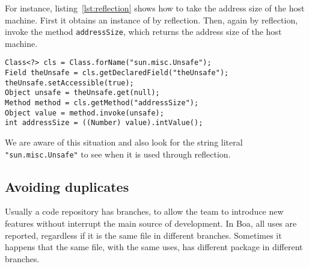 For instance, listing~\ref{lst:reflection} shows how to take the address size of the host machine.
First it obtains an instance of \smu{} by reflection.
Then, again by reflection, invoke the method \texttt{addressSize}, which returns the address size of the host machine.


 

\lstset{style=java}
\lstset{escapechar=§}

\begin{lstlisting}[caption=Use of sun.misc.Unsafe with reflection,label=lst:reflection]
Class<?> cls = Class.forName("sun.misc.Unsafe");
Field theUnsafe = cls.getDeclaredField("theUnsafe");
theUnsafe.setAccessible(true);
Object unsafe = theUnsafe.get(null);
Method method = cls.getMethod("addressSize");
Object value = method.invoke(unsafe);
int addressSize = ((Number) value).intValue();
\end{lstlisting}

We are aware of this situation and also look for the string literal \texttt{"sun.misc.Unsafe"} to see when it is used through reflection.

\subsection{Avoiding duplicates}

Usually a code repository has branches, to allow the team to introduce new features without interrupt the main source of development.
In Boa, all \smu{} uses are reported, regardless if it is the same file in different branches.
Sometimes it happens that the same file, with the same uses, has different package in different branches.

